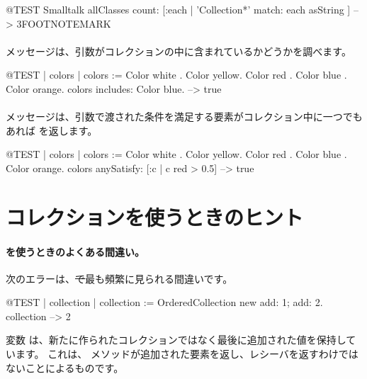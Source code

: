 \documentclass[a4paper,10pt,twoside]{book}
\begin{document}
\begin{code}{@TEST}
Smalltalk allClasses count: [:each | 'Collection*' match: each asString ] --> 3FOOTNOTEMARK
\end{code}

\paragraph{}  メッセージは、引数がコレクションの中に含まれているかどうかを調べます。

\begin{code}{@TEST | colors |}
colors := {Color white . Color yellow. Color red . Color blue . Color orange}.
colors includes: Color blue. --> true
\end{code}

\paragraph{}  メッセージは、引数で渡された条件を満足する要素がコレクション中に一つでもあれば  を返します。

\begin{code}{@TEST | colors | colors := {Color white . Color yellow. Color red . Color blue . Color orange}.}
colors anySatisfy: [:c | c red > 0.5] --> true
\end{code}
\section{コレクションを使うときのヒント}

\paragraph{ を使うときのよくある間違い。} 次のエラーは、\st で最も頻繁に見られる間違いです。

\begin{code}{@TEST | collection | }
collection := OrderedCollection new add: 1; add: 2.
collection --> 2
\end{code}
\noindent
変数  は、新たに作られたコレクションではなく最後に追加された値を保持しています。
これは、 メソッドが追加された要素を返し、レシーバを返すわけではないことによるものです。
\end{document}
